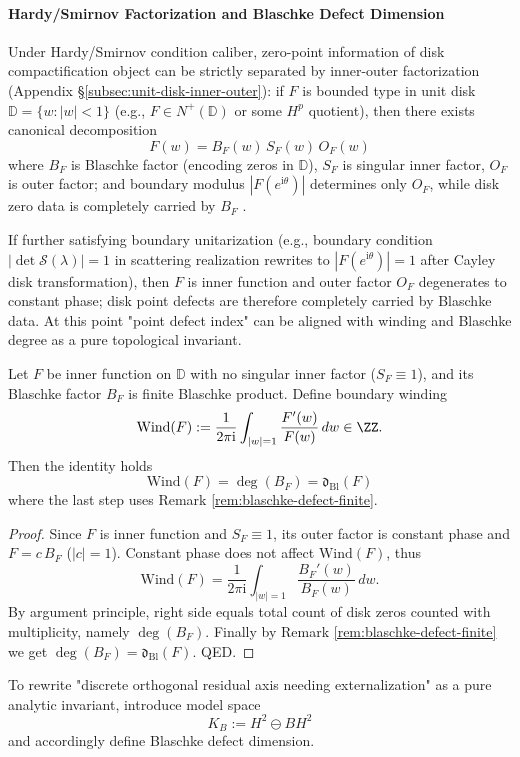 \paragraph{Hardy/Smirnov Factorization and Blaschke Defect Dimension}
Under Hardy/Smirnov condition caliber, zero-point information of disk compactification object can be strictly separated by inner-outer factorization (Appendix \S\ref{subsec:unit-disk-inner-outer}):
if \(F\) is bounded type in unit disk \(\mathbb{D}=\{w:|w|<1\}\) (e.g., \(F\in N^+(\mathbb{D})\) or some \(H^p\) quotient), then there exists canonical decomposition
\[
\boxed{\;F(w)=B_F(w)\,S_F(w)\,O_F(w)\;}
\]
where \(B_F\) is Blaschke factor (encoding zeros in \(\mathbb{D}\)), \(S_F\) is singular inner factor, \(O_F\) is outer factor; and boundary modulus \(|F(e^{\mathrm{i}\theta})|\) determines only \(O_F\), while disk zero data is completely carried by \(B_F\) \cite{Duren1970TheoryHp,Garnett2007BoundedAnalyticFunctions}.
\par
If further satisfying boundary unitarization (e.g., boundary condition \(|\det\mathcal S(\lambda)|=1\) in scattering realization rewrites to \(|F(e^{\mathrm{i}\theta})|=1\) after Cayley disk transformation), then \(F\) is inner function and outer factor \(O_F\) degenerates to constant phase; disk point defects are therefore completely carried by Blaschke data. At this point "point defect index" can be aligned with winding and Blaschke degree as a pure topological invariant.

\begin{proposition}[Winding=\texorpdfstring{$\deg(B_F)$}{deg(B)} (Finite Blaschke/No Singular Inner Factor Caliber)]\label{prop:winding-equals-blaschke-degree}
Let \(F\) be inner function on \(\mathbb{D}\) with no singular inner factor (\(S_F\equiv 1\)), and its Blaschke factor \(B_F\) is finite Blaschke product.
Define boundary winding
\[
\mathrm{Wind}(F):=\frac{1}{2\pi\mathrm{i}}\int_{|w|=1}\frac{F'(w)}{F(w)}\,dw\in\ZZ.
\]
Then the identity holds
\[
\boxed{\;\mathrm{Wind}(F)=\deg(B_F)=\mathfrak d_{\mathrm{Bl}}(F)\;}
\]
where the last step uses Remark \ref{rem:blaschke-defect-finite}.
\end{proposition}

\begin{proof}
Since \(F\) is inner function and \(S_F\equiv 1\), its outer factor is constant phase and \(F=c\,B_F\) (\(|c|=1\)).
Constant phase does not affect \(\mathrm{Wind}(F)\), thus
\[
\mathrm{Wind}(F)=\frac{1}{2\pi\mathrm{i}}\int_{|w|=1}\frac{B_F'(w)}{B_F(w)}\,dw.
\]
By argument principle, right side equals total count of disk zeros counted with multiplicity, namely \(\deg(B_F)\).
Finally by Remark \ref{rem:blaschke-defect-finite} we get \(\deg(B_F)=\mathfrak d_{\mathrm{Bl}}(F)\). QED.
\end{proof}
\par
To rewrite "discrete orthogonal residual axis needing externalization" as a pure analytic invariant, introduce model space
\[
K_B:=H^2\ominus BH^2
\]
and accordingly define Blaschke defect dimension.

